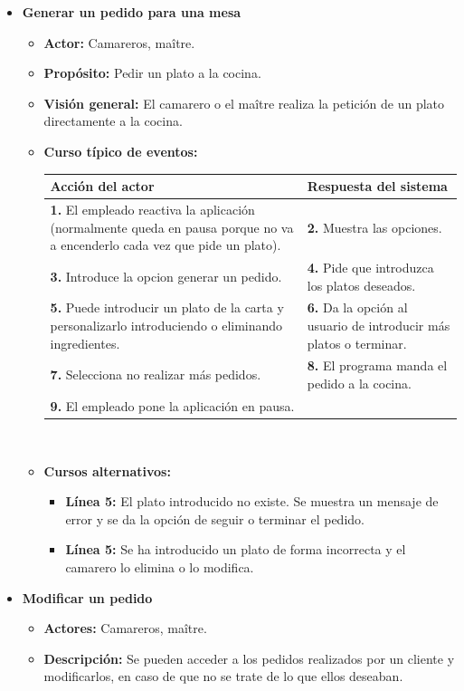 \documentclass[spanish,a4paper,12pt]{report}		%
\begin{document}
\begin{itemize}
		\item \textbf{Generar un pedido para una mesa}
			\begin{itemize}
			\item \textbf{Actor:} Camareros, maître.
			\item \textbf{Propósito: } Pedir un plato a la cocina.
			\item \textbf{Visión general:} El camarero o el maître realiza la petición de un plato directamente a la cocina.
			\item \textbf{Curso típico de eventos:} 	\\
				\begin{tabular}{|p{6cm}||p{6cm}|}
				\hline
				\textbf{Acción del actor} & \textbf{Respuesta del sistema} \\ \hline \hline
				\textbf{1.} El empleado reactiva la aplicación (normalmente queda en pausa porque no va a encenderlo cada vez que pide un plato). & \textbf{2.} Muestra las opciones.\\ \hline 
				\textbf{3.} Introduce la opcion generar un pedido. & \textbf{4.} Pide que introduzca los platos deseados. \\ \hline
				\textbf{5.} Puede introducir un plato de la carta y personalizarlo introduciendo o eliminando ingredientes. & \textbf{6.} Da la opción al usuario de introducir más platos o terminar. \\ \hline
				\textbf{7.} Selecciona no realizar más pedidos.	& \textbf{8.} El programa manda el pedido a la cocina. \\ \hline
				\textbf{9.} El empleado pone la aplicación en pausa. & \\ \hline
			\end{tabular}
			\\
			\item \textbf{Cursos alternativos:} 
			\begin{itemize}
			\item  \textbf{Línea 5:} El plato introducido no existe. Se muestra un mensaje de error y se da la opción de seguir o terminar el pedido.
			\item  \textbf{Línea 5:} Se ha introducido un plato de forma incorrecta y el camarero lo elimina o lo modifica.
			\end {itemize}
		\end {itemize}
		
		
	\item \textbf{Modificar un pedido}
			\begin{itemize}
			\item \textbf{Actores:} Camareros, maître.
			\item \textbf{Descripción:} Se pueden acceder a los pedidos realizados por un cliente y modificarlos, en caso de que no se trate de lo que ellos deseaban.
		\end {itemize}



\end{itemize}
\end{document}

